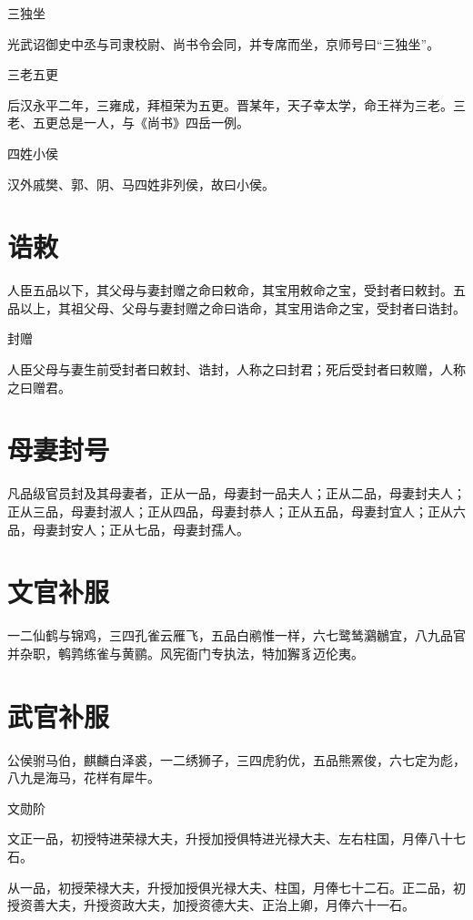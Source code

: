 \documentclass[a4paper,12pt,UTF8,twoside]{ctexbook}
\begin{document}
    三独坐
    
    光武诏御史中丞与司隶校尉、尚书令会同，并专席而坐，京师号曰“三独坐”。
    
    三老五更
    
    后汉永平二年，三雍成，拜桓荣为五更。晋某年，天子幸太学，命王祥为三老。三老、五更总是一人，与《尚书》四岳一例。
    
    四姓小侯
    
    汉外戚樊、郭、阴、马四姓非列侯，故曰小侯。
    
    \section{诰敕}
    
    人臣五品以下，其父母与妻封赠之命曰敕命，其宝用敕命之宝，受封者曰敕封。五品以上，其祖父母、父母与妻封赠之命曰诰命，其宝用诰命之宝，受封者曰诰封。
    
    封赠
    
    人臣父母与妻生前受封者曰敕封、诰封，人称之曰封君；死后受封者曰敕赠，人称之曰赠君。
    
    \section{母妻封号}
    
    凡品级官员封及其母妻者，正从一品，母妻封一品夫人；正从二品，母妻封夫人；正从三品，母妻封淑人；正从四品，母妻封恭人；正从五品，母妻封宜人；正从六品，母妻封安人；正从七品，母妻封孺人。
    
    \section{文官补服}
    
    一二仙鹤与锦鸡，三四孔雀云雁飞，五品白鹇惟一样，六七鹭鸶鸂鶒宜，八九品官并杂职，鹌鹑练雀与黄鹂。风宪衙门专执法，特加獬豸迈伦夷。
    
    \section{武官补服}
    
    公侯驸马伯，麒麟白泽裘，一二绣狮子，三四虎豹优，五品熊罴俊，六七定为彪，八九是海马，花样有犀牛。
    
    文勋阶
    
    文正一品，初授特进荣禄大夫，升授加授俱特进光禄大夫、左右柱国，月俸八十七石。
    
    从一品，初授荣禄大夫，升授加授俱光禄大夫、柱国，月俸七十二石。正二品，初授资善大夫，升授资政大夫，加授资德大夫、正治上卿，月俸六十一石。
    
\end{document}
